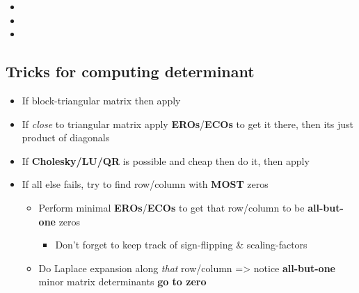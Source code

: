 \begin{itemize}
\begin{itemize}
          \item
          \item
          \item
        \end{itemize}
\end{itemize}

\subsection*{Tricks for computing
  determinant}

\begin{itemize}

  \item
        If block-triangular matrix then apply
  \item
        If \emph{close} to triangular matrix apply \textbf{EROs}/\textbf{ECOs}
        to get it there, then its just product of diagonals
  \item
        If \textbf{Cholesky/LU/QR} is possible and cheap then do it, then
        apply 
  \item
        If all else fails, try to find row/column with \textbf{MOST} zeros

        \begin{itemize}

          \item
                Perform minimal \textbf{EROs}/\textbf{ECOs} to get that row/column
                to be \textbf{all-but-one} zeros

                \begin{itemize}

                  \item
                        Don't forget to keep track of sign-flipping \& scaling-factors
                \end{itemize}
          \item
                Do Laplace expansion along \emph{that} row/column =\textgreater{}
                notice \textbf{all-but-one} minor matrix determinants \textbf{go to
                  zero}
        \end{itemize}
\end{itemize}

